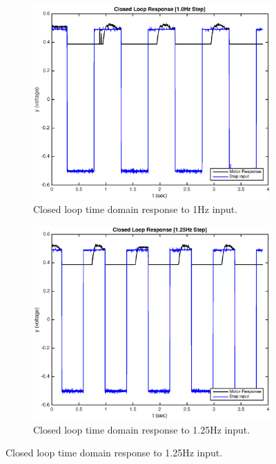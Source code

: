 \documentclass[11pt,a4paper]{article}
\begin{document}
\begin{enumerate}
\begin{figure}[H]
	  \begin{subfigure}{0.5\textwidth}
	  \includegraphics[width=0.9\linewidth]{Matlab_Code/Figures/D2_1_0Hz.eps}
	  \caption{Closed loop time domain response to 1Hz input.}
	  \label{fig:subim2}
	  \end{subfigure}
	  \begin{subfigure}{0.5\textwidth}
	  \includegraphics[width=0.9\linewidth]{Matlab_Code/Figures/D2_1_25Hz.eps}
	  \caption{Closed loop time domain response to 1.25Hz input.}
	  \label{fig:subim2}
	  \end{subfigure}
	  

\end{figure}
\end{enumerate}
\end{document}
